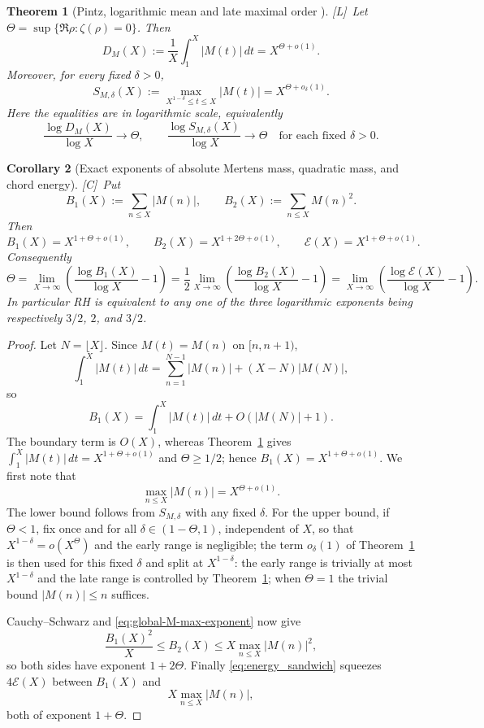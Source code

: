 \documentclass[11pt]{amsart}
\numberwithin{equation}{section}
\theoremstyle{plain}
\newtheorem{theorem}{Theorem}[section]
\newtheorem{corollary}[theorem]{Corollary}
\theoremstyle{definition}
\theoremstyle{remark}
\newcommand{\En}{\mathcal{E}}
\newcommand{\tagC}{\textup{[C]}}
\newcommand{\tagL}{\textup{[L]}}
\begin{document}
\begin{theorem}[Pintz, logarithmic mean and late maximal order
{\cite[Theorems~2.1 and~2.2]{Pintz2026}}]
\label{thm:pintz-2026}
\tagL\ Let $\Theta=\sup\{\Re\rho:\zeta(\rho)=0\}$.  Then
\[
 D_M(X):=\frac1X\int_1^X|M(t)|\,dt=X^{\Theta+o(1)}.
\]
Moreover, for every fixed $\delta>0$,
\[
 S_{M,\delta}(X):=\max_{X^{1-\delta}\le t\le X}|M(t)|
 =X^{\Theta+o_\delta(1)}.
\]
Here the equalities are in logarithmic scale, equivalently
\[
 \frac{\log D_M(X)}{\log X}\to\Theta,
 \qquad
 \frac{\log S_{M,\delta}(X)}{\log X}\to\Theta
 \quad\text{for each fixed }\delta>0.
\]
\end{theorem}

\begin{corollary}[Exact exponents of absolute Mertens mass, quadratic mass, and chord energy]
\label{cor:pintz-excursion-exponents}
\tagC\ Put
\[
 B_1(X):=\sum_{n\le X}|M(n)|,
 \qquad
 B_2(X):=\sum_{n\le X}M(n)^2.
\]
Then
\begin{equation}
\label{eq:pintz-B1-B2}
 B_1(X)=X^{1+\Theta+o(1)},
 \qquad
 B_2(X)=X^{1+2\Theta+o(1)},
 \qquad
 \En(X)=X^{1+\Theta+o(1)}.
\end{equation}
Consequently
\begin{equation}
\label{eq:Theta-from-excursions}
 \Theta=\lim_{X\to\infty}\left(\frac{\log B_1(X)}{\log X}-1\right)
 =\frac12\lim_{X\to\infty}
 \left(\frac{\log B_2(X)}{\log X}-1\right)
 =\lim_{X\to\infty}\left(\frac{\log\En(X)}{\log X}-1\right).
\end{equation}
In particular RH is equivalent to any one of the three logarithmic exponents
being respectively $3/2$, $2$, and $3/2$.
\end{corollary}

\begin{proof}
Let $N=\lfloor X\rfloor$.  Since $M(t)=M(n)$ on $[n,n+1)$,
\[
 \int_1^X|M(t)|\,dt
 =\sum_{n=1}^{N-1}|M(n)|+(X-N)|M(N)|,
\]
so
\[
 B_1(X)=\int_1^X|M(t)|\,dt+O(|M(N)|+1).
\]
The boundary term is $O(X)$, whereas Theorem~\ref{thm:pintz-2026} gives
$\int_1^X|M(t)|\,dt=X^{1+\Theta+o(1)}$ and $\Theta\ge1/2$; hence
$B_1(X)=X^{1+\Theta+o(1)}$.
We first note that
\begin{equation}
\label{eq:global-M-max-exponent}
 \max_{n\le X}|M(n)|=X^{\Theta+o(1)}.
\end{equation}
The lower bound follows from $S_{M,\delta}$ with any fixed $\delta$.  For
the upper bound, if $\Theta<1$, fix once and for all
$\delta\in(1-\Theta,1)$, independent of $X$, so that $X^{1-\delta}=o(X^\Theta)$ and the early range
is negligible; the term $o_\delta(1)$ of
Theorem~\ref{thm:pintz-2026} is then used for this fixed $\delta$ and split at
$X^{1-\delta}$: the early range is trivially at most $X^{1-\delta}$ and the
late range is controlled by Theorem~\ref{thm:pintz-2026}; when $\Theta=1$
the trivial bound $|M(n)|\le n$ suffices.

Cauchy--Schwarz and \eqref{eq:global-M-max-exponent} now give
\[
 \frac{B_1(X)^2}{X}\le B_2(X)
 \le X\max_{n\le X}|M(n)|^2,
\]
so both sides have exponent $1+2\Theta$.  Finally
\eqref{eq:energy_sandwich} squeezes $4\En(X)$ between $B_1(X)$ and
\[
 X\max_{n\le X}|M(n)|,
\]
both of exponent $1+\Theta$.
\end{proof}
\end{document}
